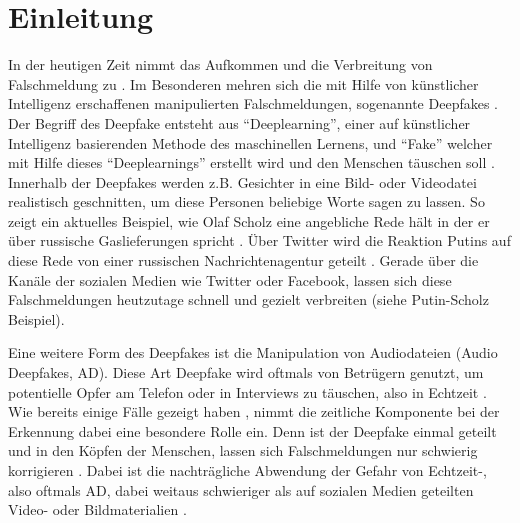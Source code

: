 \section{Einleitung}
In der heutigen Zeit nimmt das Aufkommen und die Verbreitung von Falschmeldung zu \citep[][]{Hancock2021}.
Im Besonderen mehren sich die mit Hilfe von künstlicher Intelligenz erschaffenen manipulierten Falschmeldungen, sogenannte Deepfakes \citep[][]{Shahzad2022}.
Der Begriff des Deepfake entsteht aus ``Deeplearning'', einer auf künstlicher Intelligenz basierenden Methode des maschinellen Lernens, und ``Fake'' welcher mit Hilfe dieses ``Deeplearnings'' erstellt wird und den Menschen täuschen soll \citep[][]{Mueller2022}.
Innerhalb der Deepfakes werden z.B. Gesichter in eine Bild- oder Videodatei realistisch geschnitten, um diese Personen beliebige Worte sagen zu lassen.
So zeigt ein aktuelles Beispiel, wie Olaf Scholz eine angebliche Rede hält in der er über russische Gaslieferungen spricht \citep[][]{Klasen2022}.
Über Twitter wird die Reaktion Putins auf diese Rede von einer russischen Nachrichtenagentur geteilt \citep[Vgl.][]{Klasen2022}.
Gerade über die Kanäle der sozialen Medien wie Twitter oder Facebook, lassen sich diese Falschmeldungen heutzutage schnell und gezielt verbreiten (siehe Putin-Scholz Beispiel).
\par
Eine weitere Form des Deepfakes ist die Manipulation von Audiodateien (Audio Deepfakes, AD).
Diese Art Deepfake wird oftmals von Betrügern genutzt, um potentielle Opfer am Telefon oder in Interviews zu täuschen, also in Echtzeit \citep[][]{Mueller2022}.
Wie bereits einige Fälle gezeigt haben \citep[vgl.][]{Stupp2019}, nimmt die zeitliche Komponente bei der Erkennung dabei eine besondere Rolle ein.
Denn ist der Deepfake einmal geteilt und in den Köpfen der Menschen, lassen sich Falschmeldungen nur schwierig korrigieren \citep[][]{Hancock2021}.
Dabei ist die nachträgliche Abwendung der Gefahr von Echtzeit-, also oftmals AD, dabei weitaus schwieriger als auf sozialen Medien geteilten Video- oder Bildmaterialien \citep[][]{Shahzad2022}.
\par
